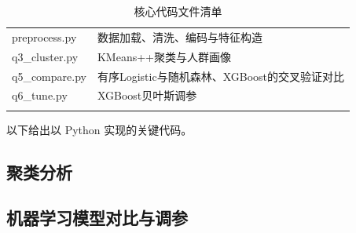 \begin{appendices}
\begin{table}[H]
\centering
\caption{核心代码文件清单}
\begin{tabular}{M{6cm}M{8cm}}
\bluetoprule
{}
 &  \\
\hline
preprocess.py & 数据加载、清洗、编码与特征构造 \\
q3\_cluster.py & KMeans++聚类与人群画像 \\
q5\_compare.py & 有序Logistic与随机森林、XGBoost的交叉验证对比 \\
q6\_tune.py & XGBoost贝叶斯调参 \\
\bluebottomrule
\end{tabular}
\end{table}

以下给出以 Python 实现的关键代码。

\subsection{聚类分析}



\subsection{机器学习模型对比与调参}





\end{appendices}
